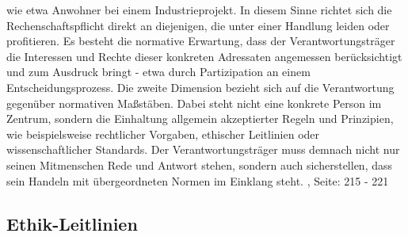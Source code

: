 wie etwa Anwohner bei einem Industrieprojekt. In diesem Sinne richtet sich die Rechenschaftspflicht direkt an diejenigen, die unter einer Handlung leiden oder profitieren. Es besteht die normative Erwartung, dass der Verantwortungsträger die Interessen und Rechte dieser konkreten Adressaten angemessen berücksichtigt und zum Ausdruck bringt - etwa durch Partizipation an einem Entscheidungsprozess. Die zweite Dimension bezieht sich auf die Verantwortung gegenüber normativen Maßstäben. Dabei steht nicht eine konkrete Person im Zentrum, sondern die Einhaltung allgemein akzeptierter Regeln und Prinzipien, wie beispielsweise rechtlicher Vorgaben, ethischer Leitlinien oder wissenschaftlicher Standards. Der Verantwortungsträger muss demnach nicht nur seinen Mitmenschen Rede und Antwort stehen, sondern auch sicherstellen, dass sein Handeln mit übergeordneten Normen im Einklang steht. \cite{neuhaeuserHandbuchAngewandteEthik2023}, Seite: 215 - 221


\subsection{Ethik-Leitlinien}

